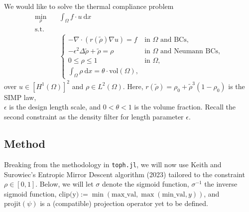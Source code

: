 We would like to solve the thermal compliance problem
\begin{equation}\label{eq:thermal_compliance_problem}
    \begin{aligned}
        \min_{\rho} &\quad \int_\Omega f \cdot u \ \mathrm{d}x\\
        \text{s.t.} &\\
        &\quad\begin{cases}
            -\nabla \cdot (r(\tilde{\rho}) \nabla u) = f & \text{in } \Omega \text{ and BCs},\\
            - \epsilon^2 \Delta \tilde{\rho} + \tilde{\rho} = \rho & \text{in } \Omega \text{ and Neumann BCs},\\
            0 \leq \rho \leq 1 & \text{in } \Omega,\\
            \int_\Omega \rho\ \mathrm{d} x = \theta\cdot\text{vol}(\Omega),
        \end{cases}
    \end{aligned}
\end{equation}
over $u \in [H^1(\Omega)]^2$ and $\rho \in L^2(\Omega)$. Here, $r(\tilde{\rho}) = \rho_0 + \tilde{\rho}^3(1 - \rho_0)$
is the SIMP law,\\ $\epsilon$ is the design length scale, and $0 < \theta < 1$ is the volume fraction. Recall the
second constraint as the density filter for length parameter $\epsilon$.

\subsection{Method}

Breaking from the methodology in \texttt{toph.jl}, we will now use Keith and Surowiec's Entropic Mirror Descent algorithm (2023)
tailored to the constraint $\rho \in [0,1]$. Below, we will let $\sigma$ denote the sigmoid function, $\sigma^{-1}$
the inverse sigmoid function,
$\text{clip(y)} := \min(\text{max\_val}, \max(\text{min\_val}, y))$, and $\text{projit}(\psi)$ is a (compatible) projection
operator yet to be defined.

